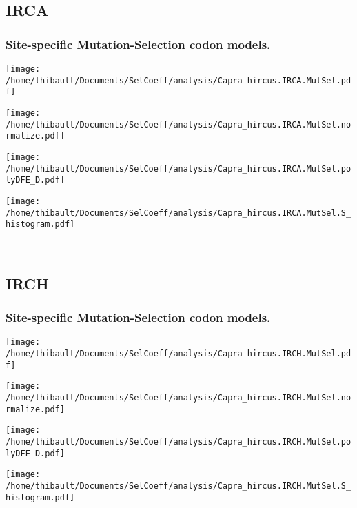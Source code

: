 \subsection{IRCA} 
 
\subsubsection*{Site-specific Mutation-Selection codon models.} 
\begin{minipage}{0.49\linewidth} 
\texttt{[image: /home/thibault/Documents/SelCoeff/analysis/Capra\_hircus.IRCA.MutSel.pdf]} 
\end{minipage}
\begin{minipage}{0.49\linewidth} 
\texttt{[image: /home/thibault/Documents/SelCoeff/analysis/Capra\_hircus.IRCA.MutSel.normalize.pdf]} 
\end{minipage}
\begin{minipage}{0.49\linewidth} 
\texttt{[image: /home/thibault/Documents/SelCoeff/analysis/Capra\_hircus.IRCA.MutSel.polyDFE\_D.pdf]} 
\end{minipage}
\begin{minipage}{0.49\linewidth} 
\texttt{[image: /home/thibault/Documents/SelCoeff/analysis/Capra\_hircus.IRCA.MutSel.S\_histogram.pdf]} 
\end{minipage}
\\ 
\subsection{IRCH} 
 
\subsubsection*{Site-specific Mutation-Selection codon models.} 
\begin{minipage}{0.49\linewidth} 
\texttt{[image: /home/thibault/Documents/SelCoeff/analysis/Capra\_hircus.IRCH.MutSel.pdf]} 
\end{minipage}
\begin{minipage}{0.49\linewidth} 
\texttt{[image: /home/thibault/Documents/SelCoeff/analysis/Capra\_hircus.IRCH.MutSel.normalize.pdf]} 
\end{minipage}
\begin{minipage}{0.49\linewidth} 
\texttt{[image: /home/thibault/Documents/SelCoeff/analysis/Capra\_hircus.IRCH.MutSel.polyDFE\_D.pdf]} 
\end{minipage}
\begin{minipage}{0.49\linewidth} 
\texttt{[image: /home/thibault/Documents/SelCoeff/analysis/Capra\_hircus.IRCH.MutSel.S\_histogram.pdf]} 
\end{minipage}
\\ 

